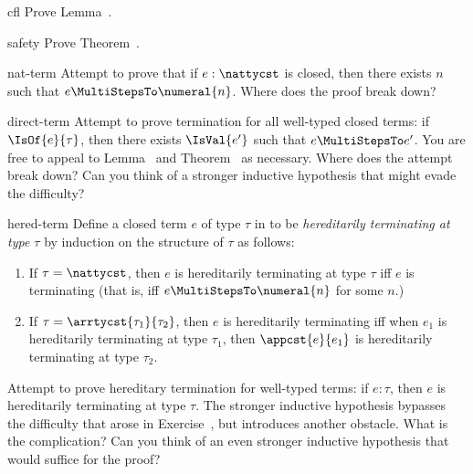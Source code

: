 \begin{exercises}
  
  \begin{exercise}{cfl}
%
    Prove Lemma~.
  \end{exercise}

  \begin{exercise}{safety}
%
    Prove Theorem~.
  \end{exercise}

  \begin{exercise}{nat-term}
%
    Attempt to prove that if $e:\nattycst$ is closed, then there exists $n$ such that
    $e\MultiStepsTo\numeral{n}$.  Where does the proof break down?
  \end{exercise}

  \begin{exercise}{direct-term}
%
    Attempt to prove termination for all well-typed closed terms: if $\IsOf{e}{\tau}$,
    then there exists $\IsVal{e'}$ such that $e\MultiStepsTo e'$.  You are free
    to appeal to Lemma~ and
    Theorem~ as necessary.  Where does the attempt break
    down?  Can you think of a stronger inductive hypothesis that might evade the
    difficulty?
  \end{exercise}

  \begin{exercise}{hered-term}
    Define a closed term $e$ of type $\tau$ in \LangT{} to be \emph{hereditarily
      terminating at type $\tau$} by induction on the structure of $\tau$ as
    follows:
    \begin{enumerate}
    \item If $\tau=\nattycst$, then $e$ is hereditarily
      terminating at type $\tau$ iff $e$ is terminating (that is, iff
      $e\MultiStepsTo\numeral{n}$ for some $n$.)
    \item If $\tau=\arrtycst{\tau_1}{\tau_2}$, then $e$ is 
      hereditarily terminating iff when $e_1$ is hereditarily terminating at
      type $\tau_1$, then $\appcst{e}{e_1}$ is hereditarily terminating at type
      $\tau_2$.
    \end{enumerate}
    Attempt to prove hereditary termination for well-typed terms: if $e:\tau$,
    then $e$ is hereditarily terminating at type $\tau$.  The stronger inductive
    hypothesis bypasses the difficulty that arose in
    Exercise~, but introduces another obstacle.  What
    is the complication?  Can you think of an even stronger inductive hypothesis
    that would suffice for the proof?
  \end{exercise}


\end{exercises}
